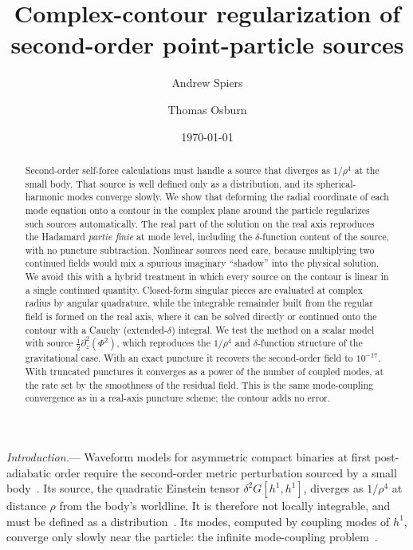\documentclass[aps,prl,twocolumn,superscriptaddress,nofootinbib,floatfix]{revtex4-2}
\begin{document}
\title{Complex-contour regularization of second-order point-particle sources}

\author{Andrew Spiers}
\author{Thomas Osburn}
\affiliation{}

\date{\today}

\begin{abstract}
Second-order self-force calculations must handle a source that diverges as $1/\rho^4$ at the small body.
That source is well defined only as a distribution, and its spherical-harmonic modes converge slowly.
We show that deforming the radial coordinate of each mode equation onto a contour in the complex plane around the particle regularizes such sources automatically.
The real part of the solution on the real axis reproduces the Hadamard \emph{partie finie} at mode level, including the $\delta$-function content of the source, with no puncture subtraction.
Nonlinear sources need care, because multiplying two continued fields would mix a spurious imaginary ``shadow'' into the physical solution.
We avoid this with a hybrid treatment in which every source on the contour is linear in a single continued quantity.
Closed-form singular pieces are evaluated at complex radius by angular quadrature, while the integrable remainder built from the regular field is formed on the real axis, where it can be solved directly or continued onto the contour with a Cauchy (extended-$\delta$) integral.
We test the method on a scalar model with source $\tfrac12\partial_z^2(\Phi^2)$, which reproduces the $1/\rho^4$ and $\delta$-function structure of the gravitational case.
With an exact puncture it recovers the second-order field to $10^{-17}$.
With truncated punctures it converges as a power of the number of coupled modes, at the rate set by the smoothness of the residual field.
This is the same mode-coupling convergence as in a real-axis puncture scheme; the contour adds no error.
\end{abstract}

\maketitle

\emph{Introduction.}---%
Waveform models for asymmetric compact binaries at first post-adiabatic order require the second-order metric perturbation sourced by a small body~\cite{Warburton2021,Wardell2023,Pound2020,BarackPound2019}.
Its source, the quadratic Einstein tensor $\delta^2G[h^1,h^1]$, diverges as $1/\rho^4$ at distance $\rho$ from the body's worldline.
It is therefore not locally integrable, and must be defined as a distribution~\cite{MusaeusPoundUpton2026}.
Its modes, computed by coupling modes of $h^1$, converge only slowly near the particle: the infinite mode-coupling problem~\cite{MillerWardellPound2016}.
\end{document}
